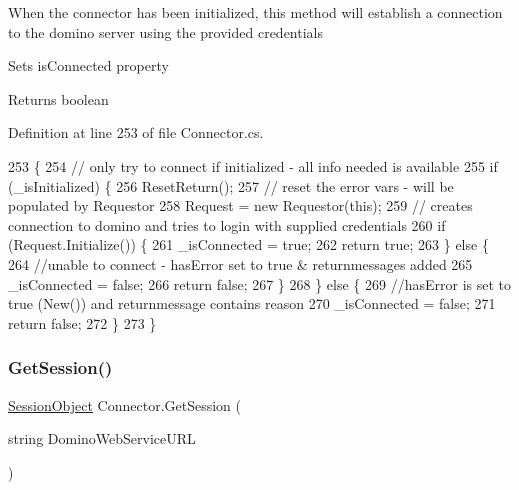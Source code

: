 When the connector has been initialized, this method will establish a connection to the domino server using the provided credentials 

Sets is\+Connected property

\begin{DoxyReturn}{Returns}
boolean
\end{DoxyReturn}


Definition at line 253 of file Connector.\+cs.


\begin{DoxyCode}
253                           \{
254         \textcolor{comment}{// only try to connect if initialized - all info needed is available}
255         \textcolor{keywordflow}{if} (\_isInitialized) \{
256             ResetReturn();
257             \textcolor{comment}{// reset the error vars - will be populated by Requestor}
258             Request = \textcolor{keyword}{new} Requestor(\textcolor{keyword}{this});
259             \textcolor{comment}{// creates connection to domino and tries to login with supplied credentials}
260             \textcolor{keywordflow}{if} (Request.Initialize()) \{
261                 \_isConnected = \textcolor{keyword}{true};
262                 \textcolor{keywordflow}{return} \textcolor{keyword}{true};
263             \} \textcolor{keywordflow}{else} \{
264                 \textcolor{comment}{//unable to connect - hasError set to true & returnmessages added}
265                 \_isConnected = \textcolor{keyword}{false};
266                 \textcolor{keywordflow}{return} \textcolor{keyword}{false};
267             \}
268         \} \textcolor{keywordflow}{else} \{
269             \textcolor{comment}{//hasError is set to true (New()) and returnmessage contains reason}
270             \_isConnected = \textcolor{keyword}{false};
271             \textcolor{keywordflow}{return} \textcolor{keyword}{false};
272         \}
273     \}
\end{DoxyCode}
\mbox{\label{class_connector_a5d089c1639f255966f00b2b05add0993}} 
\subsubsection{\texorpdfstring{Get\+Session()}{GetSession()}}
{\footnotesize\ttfamily \mbox{\hyperlink{class_session_object}{Session\+Object}} Connector.\+Get\+Session (\begin{DoxyParamCaption}\item[{string}]{Domino\+Web\+Service\+U\+RL }\end{DoxyParamCaption})}



